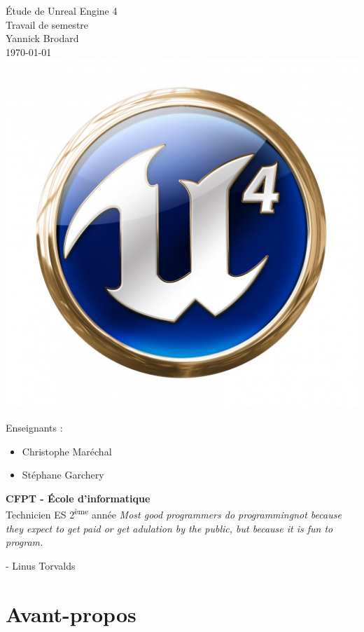 \documentclass[11pt, a4paper, oneside]{article}
\begin{document}
\begin{center}
{\Huge{Étude de Unreal Engine 4}} \\[0.5cm]
{\LARGE{Travail de semestre}}\\[0.5cm]
{\Large{Yannick Brodard}}\\[0.3cm]
\today\\
\includegraphics[scale=0.4]{UE4_logo}
\end{center}
Enseignants :
\begin{itemize}
\item Christophe Maréchal
\item Stéphane Garchery\\[3cm]
\end{itemize}
\textbf{CFPT - École d'informatique}\\
Technicien ES 2\textsuperscript{ème} année
\thispagestyle{empty}
\newpage
\vspace*{\fill}
\textit{Most good programmers do programmingnot because they expect to get paid or get adulation by the public, but because it is fun to program.}

- Linus Torvalds
\vspace*{\fill}
\thispagestyle{empty}
\newpage
\part{Avant-propos}
\end{document}
